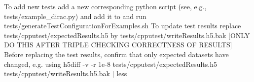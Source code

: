 To add new tests add a new corresponding python script (see, e.\+g., {\ttfamily tests/example\+\_\+dirac.\+py}) and add it to and run {\ttfamily tests/generate\+Test\+Configuration\+For\+Examples.\+sh} To update test results replace {\ttfamily tests/cpputest/expected\+Results.\+h5} by {\ttfamily tests/cpputest/write\+Results.\+h5.\+bak} \mbox{[}O\+N\+LY DO T\+H\+IS A\+F\+T\+ER T\+R\+I\+P\+LE C\+H\+E\+C\+K\+I\+NG C\+O\+R\+R\+E\+C\+T\+N\+E\+SS OF R\+E\+S\+U\+L\+TS\mbox{]} Before replacing the test results, confirm that only expected datasets have changed, e.\+g. using {\ttfamily h5diff -\/v -\/r 1e-\/8 tests/cpputest/expected\+Results.\+h5 tests/cpputest/write\+Results.\+h5.\+bak $\vert$ less} 